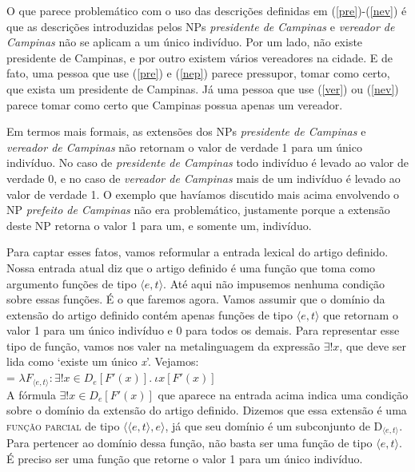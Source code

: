O que parece problemático com o uso das descrições definidas em
(\ref{pre})-(\ref{nev}) é que as descrições introduzidas pelos NPs
\textit{presidente de Campinas} e \textit{vereador de Campinas} não se aplicam a
um único indivíduo. Por um lado, não existe presidente de
Campinas, e por outro existem vários vereadores na cidade. E de
fato, uma pessoa que use (\ref{pre}) e (\ref{nep}) parece
pressupor, tomar como certo, que exista um presidente de Campinas.
Já uma pessoa que use (\ref{ver}) ou (\ref{nev}) parece tomar como
certo que Campinas possua apenas um vereador.

Em termos mais formais, as extensões dos NPs \textit{presidente de
Campinas} e \textit{vereador de Campinas} não retornam o valor de verdade
1 para um único indivíduo. No caso de \textit{presidente de Campinas}
todo indivíduo é levado ao valor de verdade 0, e no caso de
\textit{vereador de Campinas} mais de um indivíduo é levado ao valor de
verdade 1. O exemplo que havíamos discutido mais acima envolvendo
o NP \textit{prefeito de Campinas} não era problemático, justamente
porque a extensão deste NP retorna o valor 1 para um, e somente
um, indivíduo.

Para captar esses fatos, vamos reformular a entrada lexical do
artigo definido. Nossa entrada atual diz que o artigo definido é
uma função que toma como argumento funções de tipo $\langle
e,t\rangle$. Até aqui não impusemos nenhuma condição sobre essas
funções. É o que faremos agora. Vamos assumir que o domínio da
extensão do artigo definido contém apenas funções de tipo $\langle
e,t\rangle$ que retornam o valor 1 para um único indivíduo e 0
para todos os demais. Para representar esse tipo de função, vamos nos valer na metalinguagem da expressão $\exists !x$, que deve ser lida como `existe um único \textit{x}'. Vejamos:\\

\n {} = $\lambda F_{\langle e,t\rangle}:\exists !x \in D_{e}[ F'(x)].\ \iota x[F'(x)]$\\


\n A fórmula \underline{$\exists !x \in D_{e}[
F'(x)]$} que aparece na entrada acima indica uma
condição sobre o domínio da extensão do artigo definido. Dizemos
que essa extensão é uma \textsc{função parcial} de tipo
$\langle\langle e,t\rangle ,e\rangle$, já que seu domínio é um
subconjunto de D$_{\langle e,t\rangle}$. Para pertencer ao domínio
dessa função, não basta ser uma função de tipo $\langle
e,t\rangle$. É preciso ser uma função que retorne o valor 1 para
um único indivíduo.

